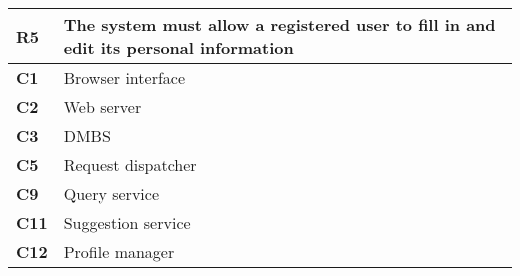 \begin{table}[H]
    \centering
    \begin{tabular}{|l|m{10cm}|}
        \hline \textbf{R5} & The system must allow a registered user to fill in and edit its personal information \\
        \hline \textbf{C1} & Browser interface \\
        \hline \textbf{C2} & Web server \\
        \hline \textbf{C3} & DMBS \\
        \hline \textbf{C5} & Request dispatcher \\
        \hline \textbf{C9} & Query service \\
        \hline \textbf{C11} & Suggestion service \\
        \hline \textbf{C12} & Profile manager \\
        \hline
    \end{tabular}
\end{table}

